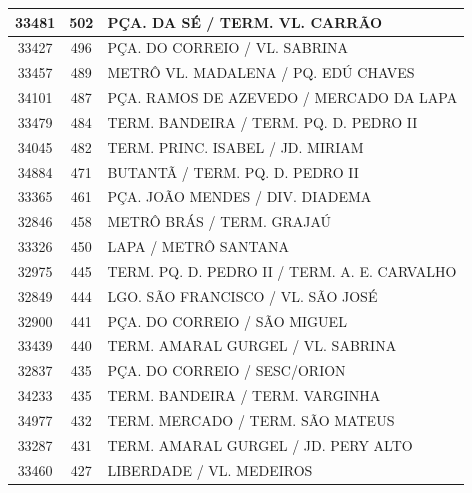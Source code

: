 \documentclass[
	12pt,				%
	oneside,			%
	a4paper,			%
	english,			%
	brazil				%
	]{abntex2ppgsi}
\begin{document}
\begin{apendicesenv}
\begin{longtable}{c|c|p{7cm}}
    33481 & 502   & PÇA. DA SÉ / TERM. VL. CARRÃO \\
\hline

    33427 & 496   & PÇA. DO CORREIO / VL. SABRINA \\
\hline

    33457 & 489   & METRÔ VL. MADALENA / PQ. EDÚ CHAVES \\
\hline

    34101 & 487   & PÇA. RAMOS DE AZEVEDO / MERCADO DA LAPA \\
\hline

    33479 & 484   & TERM. BANDEIRA / TERM. PQ. D. PEDRO II \\
\hline

    34045 & 482   & TERM. PRINC. ISABEL / JD. MIRIAM \\
\hline

    34884 & 471   & BUTANTÃ / TERM. PQ. D. PEDRO II \\
\hline

    33365 & 461   & PÇA. JOÃO MENDES / DIV. DIADEMA \\
\hline

    32846 & 458   & METRÔ BRÁS / TERM. GRAJAÚ \\
\hline

    33326 & 450   & LAPA / METRÔ SANTANA \\
\hline

    32975 & 445   & TERM. PQ. D. PEDRO II / TERM. A. E. CARVALHO \\
\hline

    32849 & 444   & LGO. SÃO FRANCISCO / VL. SÃO JOSÉ \\
\hline

    32900 & 441   & PÇA. DO CORREIO / SÃO MIGUEL \\
\hline

    33439 & 440   & TERM. AMARAL GURGEL / VL. SABRINA \\
\hline

    32837 & 435   & PÇA. DO CORREIO / SESC/ORION \\
\hline

    34233 & 435   & TERM. BANDEIRA / TERM. VARGINHA \\
\hline

    34977 & 432   & TERM. MERCADO / TERM. SÃO MATEUS \\
\hline

    33287 & 431   & TERM. AMARAL GURGEL / JD. PERY ALTO \\
\hline

    33460 & 427   & LIBERDADE / VL. MEDEIROS \\
\hline


\end{longtable}
\end{apendicesenv}
\end{document}
